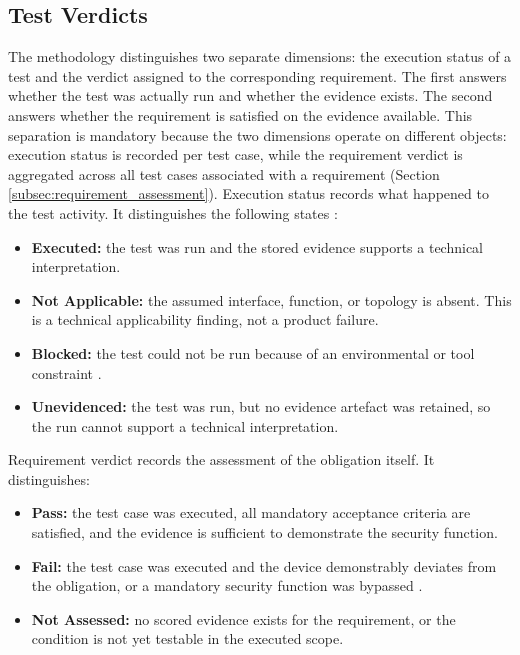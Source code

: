 \subsection{Test Verdicts} 
\label{subsec:verdicts} 

The methodology distinguishes two separate dimensions: the execution status of a test and the verdict assigned to the corresponding requirement. The first answers whether the test was actually run and whether the evidence exists. The second answers whether the requirement is satisfied on the evidence available. This separation is mandatory because the two dimensions operate on different objects: execution status is recorded per test case, while the requirement verdict is aggregated across all test cases associated with a requirement (Section \ref{subsec:requirement_assessment}). Execution status records what happened to the test activity. It distinguishes the following states \cite[p. 62]{glossar2013istqb}: 
\begin{itemize} 
	\item \textbf{Executed:} the test was run and the stored evidence supports a technical interpretation. 
	\item \textbf{Not Applicable:} the assumed interface, function, or topology is absent. This is a technical applicability finding, not a product failure. 
	\item \textbf{Blocked:} the test could not be run because of an environmental or tool constraint \cite[p. 11]{glossar2013istqb}. 
	\item \textbf{Unevidenced:} the test was run, but no evidence artefact was retained, so the run cannot support a technical interpretation.  
\end{itemize} 

Requirement verdict records the assessment of the obligation itself. It distinguishes: 

\begin{itemize} 
	\item \textbf{Pass:} the test case was executed, all mandatory acceptance criteria are satisfied, and the evidence is sufficient to demonstrate the security function. 
	\item \textbf{Fail:} the test case was executed and the device demonstrably deviates from the obligation, or a mandatory security function was bypassed \cite[p. 10]{glossar2013istqb}. 
	\item \textbf{Not Assessed:} no scored evidence exists for the requirement, or the condition is not yet testable in the executed scope. 
\end{itemize} 

